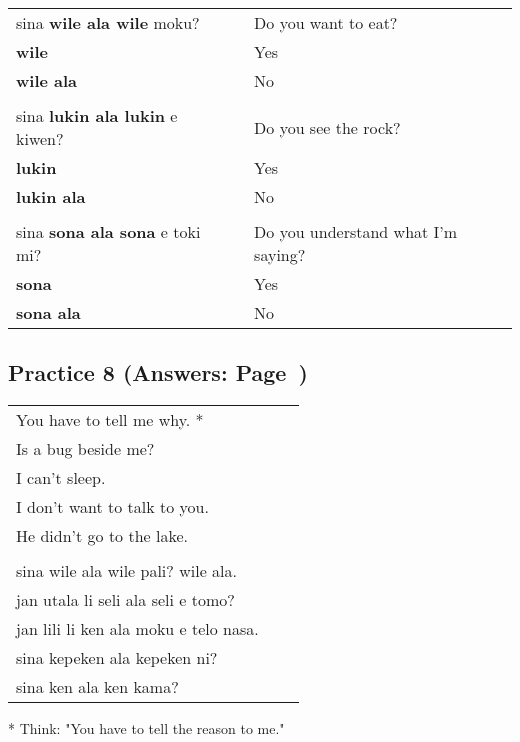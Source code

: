 \begin{supertabular}{p{5,5cm}|ll}
sina \textbf{wile ala wile} moku? && Do you want to eat? \\ \textbf{wile} && Yes \\ \textbf{wile ala} && No \\
 && \\ %
sina \textbf{lukin ala lukin} e kiwen? && Do you see the rock? \\ \textbf{lukin} && Yes \\ \textbf{lukin ala} && No \\
 && \\ %
sina \textbf{sona ala sona} e toki mi? && Do you understand what I'm saying? \\ \textbf{sona} && Yes \\ \textbf{sona ala} && No \\
\end{supertabular}  
%
\subsection*{Practice 8 (Answers: Page~\pageref{'negation_yes_no_questions'})}
%

\begin{supertabular}{p{5,5cm}|ll}
   You have to tell me why. *  &&   \\ %
   Is a bug beside me?  &&    \\ %
   I can't sleep.  &&    \\ %
   I don't want to talk to you.  &&    \\ %
   He didn't go to the lake.   &&   \\ %
 && \\ %
   sina wile ala wile pali? wile ala.  &&    \\ %
   jan utala li seli ala seli e tomo?   &&   \\ %
   jan lili li ken ala moku e telo nasa.   &&   \\ %
   sina kepeken ala kepeken ni?  &&    \\ %
   sina ken ala ken kama?   &&   \\ %
\end{supertabular} 

* Think: "You have to tell the reason to me." 
